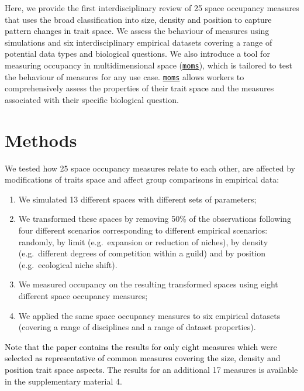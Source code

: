\documentclass[]{article}
\providecommand{\tightlist}{%
  \setlength{\itemsep}{0pt}\setlength{\parskip}{0pt}}
\begin{document}
Here, we provide the first interdisciplinary review of 25 space
occupancy measures that uses the broad classification into
\textcolor{black}{size, density and position to capture pattern changes in trait space}.
We assess the behaviour of measures using simulations and six
interdisciplinary empirical datasets covering a range of potential data
types and biological questions. We also introduce a tool for measuring
occupancy in multidimensional space
(\href{https://tguillerme.shinyapps.io/moms/}{\texttt{moms}}), which is
tailored to test the behaviour of measures for any use case.
\href{https://tguillerme.shinyapps.io/moms/}{\texttt{moms}} allows
workers to comprehensively assess the properties of their
\textcolor{black}{trait space} and the measures associated
with their specific biological question.

\section{Methods}\label{methods}

We tested how 25 space occupancy measures relate to each other, are
affected by modifications of traits space and affect group comparisons
in empirical data:

\begin{enumerate}
\def\labelenumi{\arabic{enumi}.}
\tightlist
\item
  We simulated 13 different spaces with different sets of parameters;
\item
  We transformed these spaces by removing 50\% of the observations
  following four different scenarios corresponding to different
  empirical scenarios: randomly, by limit (e.g.~expansion or reduction
  of niches), by density (e.g.~different degrees of competition within a
  guild) and by position (e.g.~ecological niche shift).
\item
  We measured occupancy on the resulting transformed spaces using eight
  different space occupancy measures;
\item
  We applied the same space occupancy measures to six empirical datasets
  (covering a range of disciplines and a range of dataset properties).
\end{enumerate}

\textcolor{black}{Note that the paper contains the results for only eight measures which were selected as representative of common measures covering the size, density and position trait space aspects.}
The results for an additional 17 measures is available in the
supplementary material 4.
\end{document}
